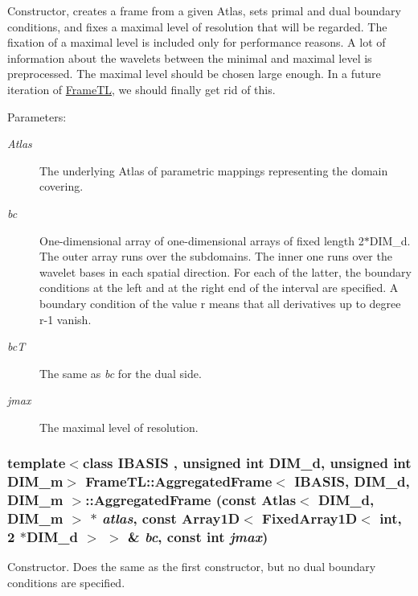 Constructor, creates a frame from a given Atlas, sets primal and dual boundary conditions, and fixes a maximal level of resolution that will be regarded. The fixation of a maximal level is included only for performance reasons. A lot of information about the wavelets between the minimal and maximal level is preprocessed. The maximal level should be chosen large enough. In a future iteration of \hyperlink{namespaceFrameTL}{FrameTL}, we should finally get rid of this.

\begin{Desc}
\item[Parameters:]
\begin{description}
\item[{\em Atlas}]The underlying Atlas of parametric mappings representing the domain covering. \item[{\em bc}]One-dimensional array of one-dimensional arrays of fixed length 2$\ast$DIM\_\-d. The outer array runs over the subdomains. The inner one runs over the wavelet bases in each spatial direction. For each of the latter, the boundary conditions at the left and at the right end of the interval are specified. A boundary condition of the value r means that all derivatives up to degree r-1 vanish. \item[{\em bcT}]The same as {\em bc\/} for the dual side. \item[{\em jmax}]The maximal level of resolution. \end{description}
\end{Desc}
\hypertarget{classFrameTL_1_1AggregatedFrame_1d3c8966d03cbff2678aabd1d8012b3b}{
\subsubsection[{AggregatedFrame}]{\setlength{\rightskip}{0pt plus 5cm}template$<$class IBASIS , unsigned int DIM\_\-d, unsigned int DIM\_\-m$>$ {\bf FrameTL::AggregatedFrame}$<$ IBASIS, DIM\_\-d, DIM\_\-m $>$::{\bf AggregatedFrame} (const Atlas$<$ DIM\_\-d, DIM\_\-m $>$ $\ast$ {\em atlas}, \/  const Array1D$<$ FixedArray1D$<$ int, 2 $\ast$DIM\_\-d $>$ $>$ \& {\em bc}, \/  const int {\em jmax})}}
\label{classFrameTL_1_1AggregatedFrame_1d3c8966d03cbff2678aabd1d8012b3b}


Constructor. Does the same as the first constructor, but no dual boundary conditions are specified. 

